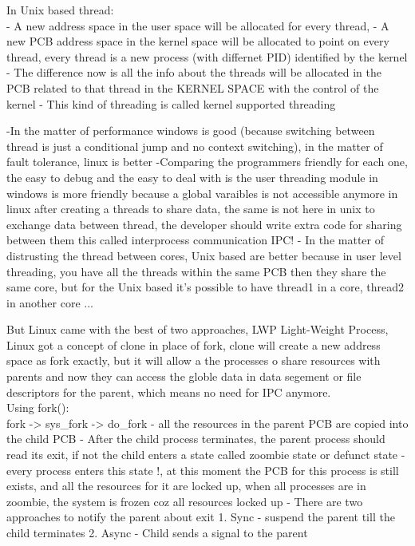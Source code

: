 \documentclass{article}
\begin{document}
In Unix based thread:\\
- A new address space in the user space will be allocated for every thread,
- A new PCB address space in the kernel space will be allocated to point on every thread, every thread is a new process (with differnet PID) identified by the kernel 
- The difference now is all the info about the threads will be allocated in the PCB related to that thread in the KERNEL SPACE with the control of the kernel
- This kind of threading is called kernel supported threading

-In the matter of performance windows is good (because switching between thread is just a conditional jump and no context switching), in the matter of fault tolerance, linux is better
-Comparing the programmers friendly for each one, the easy to debug and the easy to deal with is the user threading module in windows is more friendly because a global varaibles is not accessible anymore in linux after creating a threads to share data, the same is not here in unix
to exchange data between thread, the developer should write extra code for sharing between them this called interprocess communication IPC!
- In the matter of distrusting the thread between cores, Unix based are better because in user level threading, you have all the threads within the same PCB then they share the same core,
but for the Unix based it's possible to have thread1 in a core, thread2 in another core ...

But Linux came with the best of two approaches, LWP Light-Weight Process, Linux got a concept of clone in place of fork,
clone will create a new address space  as fork exactly, but it will allow a the processes o share resources with parents and now they can access the globle data in data segement or file descriptors for the parent, which means no need for IPC anymore.\\

Using fork():\\
fork -> sys\_fork -> do\_fork
- all the resources in the parent PCB are copied into the child PCB
- After the child process terminates, the parent process should read its exit, if not the child enters a state called zoombie state or defunct state
- every process enters this state !, at this moment the PCB for this process is still exists, and all the resources for it are locked up, when all processes are in zoombie, the system is frozen coz all resources locked up
- There are two approaches to notify the parent about exit
1. Sync  - suspend the parent till the child terminates
2. Async - Child sends a signal to the parent\\
\end{document}
